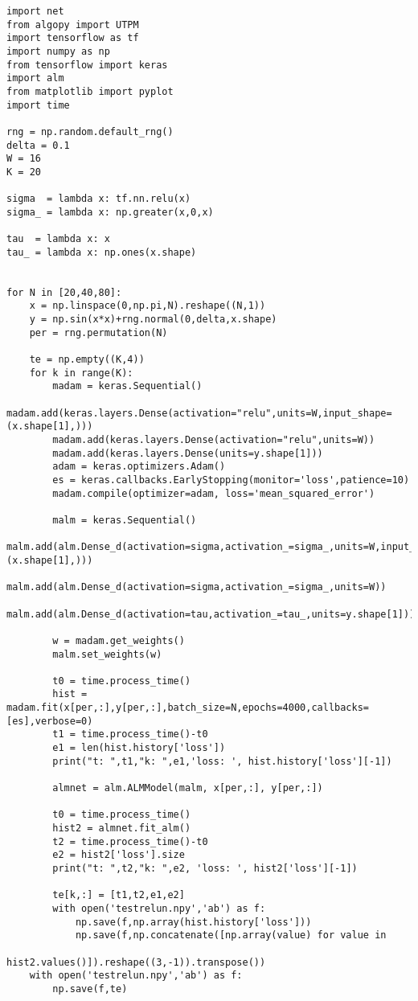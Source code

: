 \begin{verbatim}
import net
from algopy import UTPM
import tensorflow as tf
import numpy as np
from tensorflow import keras
import alm
from matplotlib import pyplot
import time

rng = np.random.default_rng()
delta = 0.1
W = 16
K = 20

sigma  = lambda x: tf.nn.relu(x)
sigma_ = lambda x: np.greater(x,0,x)

tau  = lambda x: x
tau_ = lambda x: np.ones(x.shape)


for N in [20,40,80]:
    x = np.linspace(0,np.pi,N).reshape((N,1))
    y = np.sin(x*x)+rng.normal(0,delta,x.shape)
    per = rng.permutation(N)

    te = np.empty((K,4))
    for k in range(K):
        madam = keras.Sequential() 
        madam.add(keras.layers.Dense(activation="relu",units=W,input_shape=(x.shape[1],)))
        madam.add(keras.layers.Dense(activation="relu",units=W))
        madam.add(keras.layers.Dense(units=y.shape[1]))
        adam = keras.optimizers.Adam()
        es = keras.callbacks.EarlyStopping(monitor='loss',patience=10)
        madam.compile(optimizer=adam, loss='mean_squared_error')

        malm = keras.Sequential()
        malm.add(alm.Dense_d(activation=sigma,activation_=sigma_,units=W,input_shape=(x.shape[1],)))
        malm.add(alm.Dense_d(activation=sigma,activation_=sigma_,units=W))
        malm.add(alm.Dense_d(activation=tau,activation_=tau_,units=y.shape[1]))
    
        w = madam.get_weights()
        malm.set_weights(w)
        
        t0 = time.process_time()
        hist = madam.fit(x[per,:],y[per,:],batch_size=N,epochs=4000,callbacks=[es],verbose=0)
        t1 = time.process_time()-t0
        e1 = len(hist.history['loss'])
        print("t: ",t1,"k: ",e1,'loss: ', hist.history['loss'][-1])

        almnet = alm.ALMModel(malm, x[per,:], y[per,:])

        t0 = time.process_time()
        hist2 = almnet.fit_alm()
        t2 = time.process_time()-t0
        e2 = hist2['loss'].size
        print("t: ",t2,"k: ",e2, 'loss: ', hist2['loss'][-1])
    
        te[k,:] = [t1,t2,e1,e2]
        with open('testrelun.npy','ab') as f:
            np.save(f,np.array(hist.history['loss']))
            np.save(f,np.concatenate([np.array(value) for value in 
                                      hist2.values()]).reshape((3,-1)).transpose())
    with open('testrelun.npy','ab') as f:
        np.save(f,te)
\end{verbatim}

